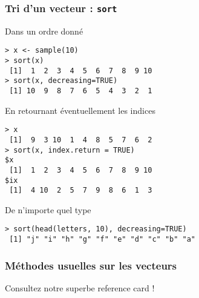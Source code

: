 \documentclass[10pt]{beamer}
\begin{document}

\begin{frame}[fragile]
  \frametitle{Tri d'un vecteur : \texttt{sort}}
  \begin{block}{Dans un ordre donné}
\begin{lstlisting}[style=block]
> x <- sample(10)
> sort(x)
 [1]  1  2  3  4  5  6  7  8  9 10
> sort(x, decreasing=TRUE)
 [1] 10  9  8  7  6  5  4  3  2  1
\end{lstlisting}
\end{block}

\begin{block}{En retournant éventuellement les indices}
\begin{lstlisting}[style=block]
> x
 [1]  9  3 10  1  4  8  5  7  6  2
> sort(x, index.return = TRUE)
$x
 [1]  1  2  3  4  5  6  7  8  9 10
$ix
 [1]  4 10  2  5  7  9  8  6  1  3
\end{lstlisting}
\end{block}

\begin{block}{De n'importe quel type}
\begin{lstlisting}[style=block]
> sort(head(letters, 10), decreasing=TRUE)
 [1] "j" "i" "h" "g" "f" "e" "d" "c" "b" "a"
\end{lstlisting}
\end{block}


\end{frame}




\begin{frame}[fragile]
  \frametitle{Méthodes usuelles sur les vecteurs}
  \begin{center}
    Consultez notre superbe \alert{reference card} !
  \end{center}
\end{frame}
\end{document}

